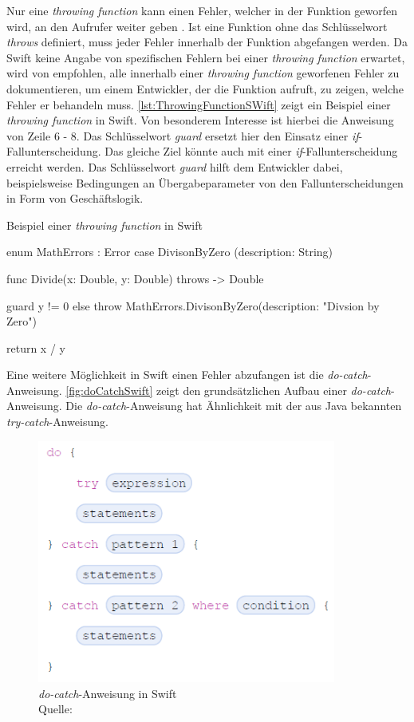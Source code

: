Nur eine \textit{throwing function} kann einen Fehler, welcher in der Funktion geworfen wird, an den Aufrufer weiter geben \cite[S.311]{Apple.2017}.
Ist eine Funktion ohne das Schlüsselwort \textit{throws} definiert, muss jeder Fehler innerhalb der Funktion abgefangen werden.
Da Swift keine Angabe von spezifischen Fehlern bei einer \textit{throwing function} erwartet, wird von \cite[S.176]{Hoffman.2017} empfohlen, alle innerhalb einer \textit{throwing function} geworfenen Fehler zu dokumentieren, um einem Entwickler, der die Funktion aufruft, zu zeigen, welche Fehler er behandeln muss.
\autoref{lst:ThrowingFunctionSWift} zeigt ein Beispiel einer \textit{throwing function} in Swift. 
Von besonderem Interesse ist hierbei die Anweisung von Zeile 6 - 8. 
Das Schlüsselwort \textit{guard} ersetzt hier den Einsatz einer \textit{if}-Fallunterscheidung.
Das gleiche Ziel könnte auch mit einer \textit{if}-Fallunterscheidung erreicht werden.
Das Schlüsselwort \textit{guard} hilft dem Entwickler dabei, beispielsweise Bedingungen an Übergabeparameter von den Fallunterscheidungen in Form von Geschäftslogik. 

\begin{listing}[H]
\caption{Beispiel einer \textit{throwing function} in Swift}
\label{lst:ThrowingFunctionSWift}
\begin{SwiftCode}
enum MathErrors : Error{
    case DivisonByZero (description: String)
}

func Divide(x: Double, y: Double) throws -> Double {
    guard y != 0 else {
        throw MathErrors.DivisonByZero(description: "Divsion by Zero")
    }
	
    return x / y
}
\end{SwiftCode}
\end{listing}

Eine weitere Möglichkeit in Swift einen Fehler abzufangen ist die \textit{do-catch}-Anweisung. 
\autoref{fig:doCatchSwift} zeigt den grundsätzlichen Aufbau einer \textit{do-catch}-Anweisung.
Die \textit{do-catch}-Anweisung hat Ähnlichkeit mit der aus Java bekannten \textit{try-catch}-Anweisung.

\begin{figure}[H]
    \centering
    \includegraphics[height=8cm]{Images/doCatch.png}
    \caption{\textit{do-catch}-Anweisung in Swift \\ Quelle:\cite[S.314]{Apple.2017}}
    \label{fig:doCatchSwift}
\end{figure}

